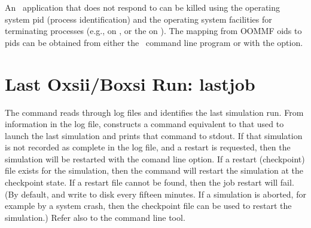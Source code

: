 An \OOMMF\ application that does not respond to  can be
killed using the
operating system pid (process identification)
and the operating system facilities for terminating processes
(e.g.,  on \Unix, or the  on
\Windows). The mapping from OOMMF oids to pids can be obtained from
either the \OOMMF\ command line program
or  with the  option.


\section{Last Oxsii/Boxsi Run:
            lastjob\label{sec:lastjob}}%

The  command reads through  log files and identifies
the last simulation run.  From information in the log file,
 constructs a command equivalent to that used to launch the
last simulation and prints that command to stdout.  If that simulation
is not recorded as complete in the log file, and a restart is requested,
then the simulation will be restarted with the  comand
line option.  If a restart (checkpoint) file exists for the simulation,
then the command will restart the simulation at the checkpoint state.
If a restart file cannot be found, then the job restart will fail.  (By
default,  and  write  to disk every fifteen minutes.  If a
simulation is aborted, for example by a system crash, then the
checkpoint file can be used to restart the simulation.)
Refer also to the  command line
tool.

